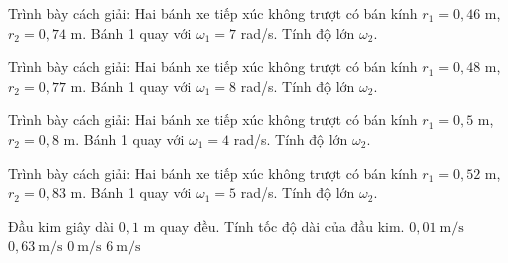 \begin{ex}
Trình bày cách giải: Hai bánh xe tiếp xúc không trượt có bán kính $r_1=0,46$ m, $r_2=0,74$ m. Bánh 1 quay với $\omega_1=7$ rad/s. Tính độ lớn $\omega_2$.
\choiceTF

\end{ex}

\begin{ex}
Trình bày cách giải: Hai bánh xe tiếp xúc không trượt có bán kính $r_1=0,48$ m, $r_2=0,77$ m. Bánh 1 quay với $\omega_1=8$ rad/s. Tính độ lớn $\omega_2$.
\choiceTF

\end{ex}

\begin{ex}
Trình bày cách giải: Hai bánh xe tiếp xúc không trượt có bán kính $r_1=0,5$ m, $r_2=0,8$ m. Bánh 1 quay với $\omega_1=4$ rad/s. Tính độ lớn $\omega_2$.
\choiceTF

\end{ex}

\begin{ex}
Trình bày cách giải: Hai bánh xe tiếp xúc không trượt có bán kính $r_1=0,52$ m, $r_2=0,83$ m. Bánh 1 quay với $\omega_1=5$ rad/s. Tính độ lớn $\omega_2$.
\choiceTF

\end{ex}

\begin{ex}
Đầu kim giây dài $0,1$ m quay đều. Tính tốc độ dài của đầu kim.
\choice
{\True $0,01\ \mathrm{m/s}$}
{$0,63\ \mathrm{m/s}$}
{$0\ \mathrm{m/s}$}
{$6\ \mathrm{m/s}$}
\end{ex}

